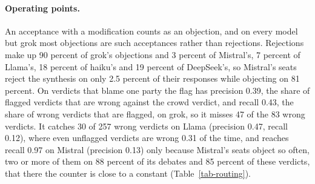 \paragraph{Operating points.}
An acceptance with a modification counts as an objection, and on every model
but grok most objections are such acceptances rather than rejections.
Rejections make up 90 percent of grok's
objections and 3 percent of Mistral's, 7 percent of Llama's, 18 percent of
haiku's and 19 percent of DeepSeek's, so Mistral's seats reject the
synthesis on only 2.5 percent of their responses while objecting on 81
percent.
On verdicts that blame one party the flag has precision 0.39, the share of
flagged verdicts that are wrong against the crowd verdict, and recall 0.43, the
share of wrong verdicts that are flagged, on grok, so it misses 47 of the 83
wrong verdicts. It catches 30 of 257 wrong verdicts on Llama (precision 0.47,
recall 0.12), where even unflagged verdicts are wrong 0.31 of the time, and
reaches recall 0.97 on Mistral (precision 0.13) only because Mistral's seats
object so often, two or more of them on 88 percent of its debates and 85
percent of these verdicts, that there the counter is close to a constant
(Table~\ref{tab-routing}).

